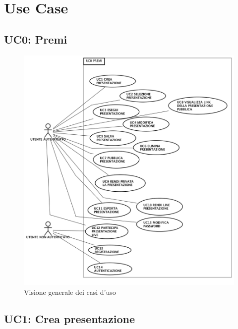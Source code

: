 
\section{Use Case}
\subsection{ UC0: Premi}
\begin{figure}[H]
	\begin{center}
	\includegraphics[scale=0.4]{diagram/UC0.png}
	\caption{Visione generale dei casi d'uso}
	\end{center}
\end{figure}

\subsection{ UC1: Crea presentazione}

